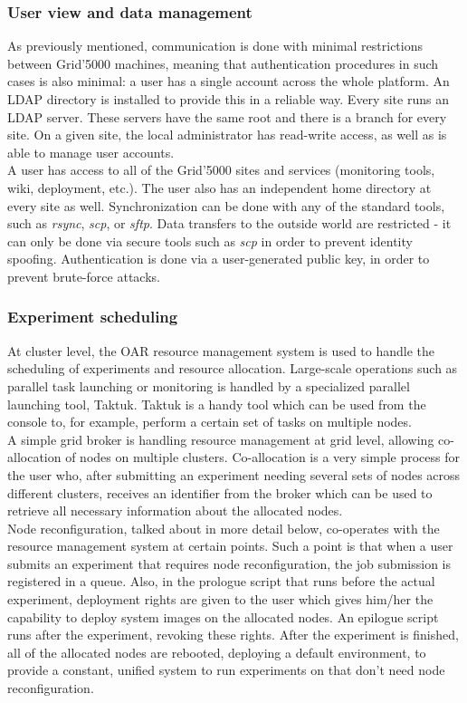 \subsubsection{User view and data management}
As previously mentioned, communication is done with minimal
restrictions between Grid'5000 machines, meaning that authentication
procedures in such cases is also minimal: a user has a single account
across the whole platform. An LDAP directory is installed to provide
this in a reliable way. Every site runs an LDAP server. These servers
have the same root and there is a branch for every site. On a given
site, the local administrator has read-write access, as well as is
able to manage user accounts.\\
A user has access to all of the Grid'5000 sites and services
(monitoring tools, wiki, deployment, etc.). The user also has an
independent home directory at every site as well. Synchronization can
be done with any of the standard tools, such as \emph{rsync},
\emph{scp}, or \emph{sftp}. Data transfers to the outside world are
restricted - it can only be done via secure tools such as \emph{scp}
in order to prevent identity spoofing. Authentication is done via a
user-generated public key, in order to prevent brute-force attacks.
\subsubsection{Experiment scheduling}
\label{sec:experiment_scheduling}
At cluster level, the OAR\cite{xdghmmnr05} resource management system is
used to handle the scheduling of experiments and resource
allocation. Large-scale operations such as parallel task launching or
monitoring is handled by a specialized parallel launching tool,
Taktuk\cite{chr09}. Taktuk is a handy tool which can be used from the
console to, for example, perform a certain set of tasks on multiple
nodes.\\
A simple grid broker is handling resource management at grid
level, allowing co-allocation of nodes on multiple
clusters. Co-allocation is a very simple process for the user who,
after submitting an experiment needing several sets of nodes across
different clusters, receives an identifier from the broker which can
be used to retrieve all necessary information about the allocated
nodes.\\
Node reconfiguration, talked about in more detail below, co-operates
with the resource management system at certain points. Such a point is
that when a user submits an experiment that requires node
reconfiguration, the job submission is registered in a queue. Also, in
the prologue script that runs before the actual experiment, deployment
rights are given to the user which gives him/her the capability to
deploy system images on the allocated nodes. An epilogue script runs
after the experiment, revoking these rights. After the experiment is
finished, all of the allocated nodes are rebooted, deploying a default
environment, to provide a constant, unified system to run experiments
on that don't need node reconfiguration.
